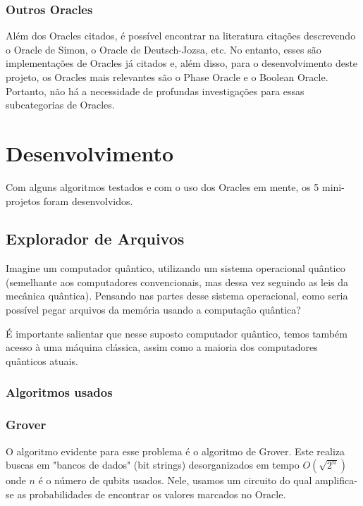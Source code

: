 \documentclass{article}
\begin{document}
\subsubsection{Outros Oracles}

Além dos Oracles citados, é possível encontrar na literatura citações descrevendo o Oracle de Simon, o Oracle de Deutsch-Jozsa, etc. No entanto, esses são implementações de Oracles já citados e, além disso, para o desenvolvimento deste projeto, os Oracles mais relevantes são o Phase Oracle e o Boolean Oracle. Portanto, não há a necessidade de profundas investigações para essas subcategorias de Oracles.


\section{Desenvolvimento}

Com alguns algoritmos testados e com o uso dos Oracles em mente, os 5 mini-projetos foram desenvolvidos.

\subsection{Explorador de Arquivos} \label{file-explorer}

Imagine um computador quântico, utilizando um sistema operacional quântico (semelhante aos computadores convencionais, mas dessa vez seguindo as leis da mecânica quântica). Pensando nas partes desse sistema operacional, como seria possível pegar arquivos da memória usando a computação quântica?

É importante salientar que nesse suposto computador quântico, temos também acesso à uma máquina clássica, assim como a maioria dos computadores quânticos atuais.

\subsubsection{Algoritmos usados}

\subsubsection{Grover}

O algoritmo evidente para esse problema é o algoritmo de Grover. Este realiza buscas em "bancos de dados" (bit strings) desorganizados em tempo $O(\sqrt{2^n})$ onde $n$ é o número de qubits usados. 
Nele, usamos um circuito do qual amplifica-se as probabilidades de encontrar os valores marcados no Oracle.
\end{document}
